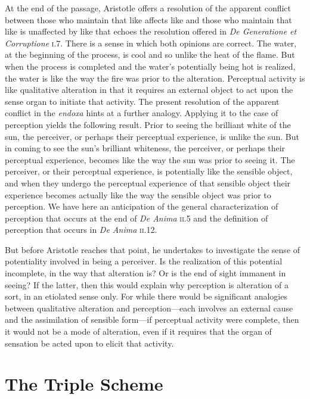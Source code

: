 At the end of the passage, Aristotle offers a resolution of the apparent conflict between those who maintain that like affects like and those who maintain that like is unaffected by like that echoes the resolution offered in \emph{De Generatione et Corruptione} \textsc{i}.7. There is a sense in which both opinions are correct. The water, at the beginning of the process, is cool and so unlike the heat of the flame. But when the process is completed and the water's potentially being hot is realized, the water is like the way the fire was prior to the alteration. Perceptual activity is like qualitative alteration in that it requires an external object to act upon the sense organ to initiate that activity. The present resolution of the apparent conflict in the \emph{endoxa} hints at a further analogy. Applying it to the case of perception yields the following result. Prior to seeing the brilliant white of the sun, the perceiver, or perhaps their perceptual experience, is unlike the sun. But in coming to see the sun's brilliant whiteness, the perceiver, or perhaps their perceptual experience, becomes like the way the sun was prior to seeing it. The perceiver, or their perceptual experience, is potentially like the sensible object, and when they undergo the perceptual experience of that sensible object their experience becomes actually like the way the sensible object was prior to perception. We have here an anticipation of the general characterization of perception that occurs at the end of \emph{De Anima} \textsc{ii}.5 and the definition of perception that occurs in \emph{De Anima} \textsc{ii}.12.

But before Aristotle reaches that point, he undertakes to investigate the sense of potentiality involved in being a perceiver. Is the realization of this potential incomplete, in the way that alteration is? Or is the end of sight immanent in seeing? If the latter, then this would explain why perception is alteration of a sort, in an etiolated sense only. For while there would be significant analogies between qualitative alteration and perception---each involves an external cause and the assimilation of sensible form---if perceptual activity were complete, then it would not be a mode of alteration, even if it requires that the organ of sensation be acted upon to elicit that activity.


\section{The Triple Scheme} %
\label{sec:the_triple_scheme}

